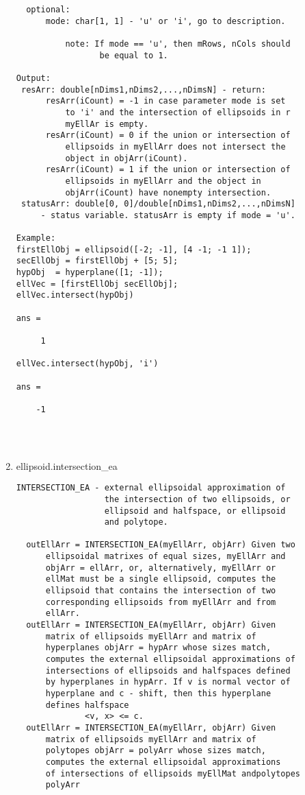 \begin{enumerate}
\begin{lstlisting}
  optional:
      mode: char[1, 1] - 'u' or 'i', go to description.

          note: If mode == 'u', then mRows, nCols should
                 be equal to 1.

Output:
 resArr: double[nDims1,nDims2,...,nDimsN] - return:
      resArr(iCount) = -1 in case parameter mode is set
          to 'i' and the intersection of ellipsoids in r
          myEllAr is empty.
      resArr(iCount) = 0 if the union or intersection of
          ellipsoids in myEllArr does not intersect the
          object in objArr(iCount).
      resArr(iCount) = 1 if the union or intersection of
          ellipsoids in myEllArr and the object in
          objArr(iCount) have nonempty intersection.
 statusArr: double[0, 0]/double[nDims1,nDims2,...,nDimsN]
     - status variable. statusArr is empty if mode = 'u'.

Example:
firstEllObj = ellipsoid([-2; -1], [4 -1; -1 1]);
secEllObj = firstEllObj + [5; 5];
hypObj  = hyperplane([1; -1]);
ellVec = [firstEllObj secEllObj];
ellVec.intersect(hypObj)

ans =

     1

ellVec.intersect(hypObj, 'i')

ans =

    -1




\end{lstlisting}
\fontfamily{\familydefault}
\selectfont
\item {ellipsoid.intersection\_ea}
\selectfont
\begin{lstlisting}
INTERSECTION_EA - external ellipsoidal approximation of
                  the intersection of two ellipsoids, or
                  ellipsoid and halfspace, or ellipsoid
                  and polytope.

  outEllArr = INTERSECTION_EA(myEllArr, objArr) Given two
      ellipsoidal matrixes of equal sizes, myEllArr and
      objArr = ellArr, or, alternatively, myEllArr or
      ellMat must be a single ellipsoid, computes the
      ellipsoid that contains the intersection of two
      corresponding ellipsoids from myEllArr and from
      ellArr.
  outEllArr = INTERSECTION_EA(myEllArr, objArr) Given
      matrix of ellipsoids myEllArr and matrix of
      hyperplanes objArr = hypArr whose sizes match,
      computes the external ellipsoidal approximations of
      intersections of ellipsoids and halfspaces defined
      by hyperplanes in hypArr. If v is normal vector of
      hyperplane and c - shift, then this hyperplane
      defines halfspace
              <v, x> <= c.
  outEllArr = INTERSECTION_EA(myEllArr, objArr) Given
      matrix of ellipsoids myEllArr and matrix of
      polytopes objArr = polyArr whose sizes match,
      computes the external ellipsoidal approximations
      of intersections of ellipsoids myEllMat andpolytopes
      polyArr


\end{lstlisting}
\end{enumerate}
